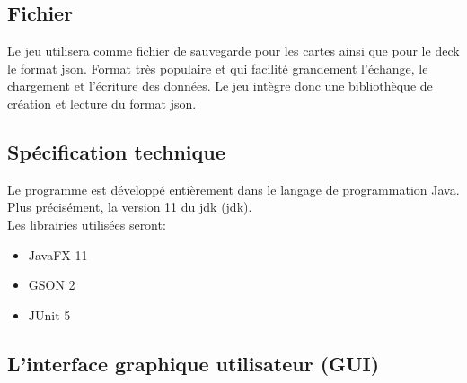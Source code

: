 \subsection{Fichier}
Le jeu utilisera comme fichier de sauvegarde pour les cartes ainsi que pour le deck le format \acrshort{json}. Format très populaire et qui facilité grandement l'échange, le chargement et l'écriture des données. Le jeu intègre donc une bibliothèque 
de création et lecture du format \acrshort{json}.

\subsection{Spécification technique}
Le programme est développé entièrement dans le langage de programmation Java. Plus précisément, la version 11 du \acrshort{jdk}  (\acrlong{jdk}).\\
Les librairies utilisées seront:
\begin{itemize}
	\item JavaFX 11
	\item GSON 2
	\item JUnit 5
\end{itemize}

\subsection{L'interface graphique utilisateur (GUI)}
